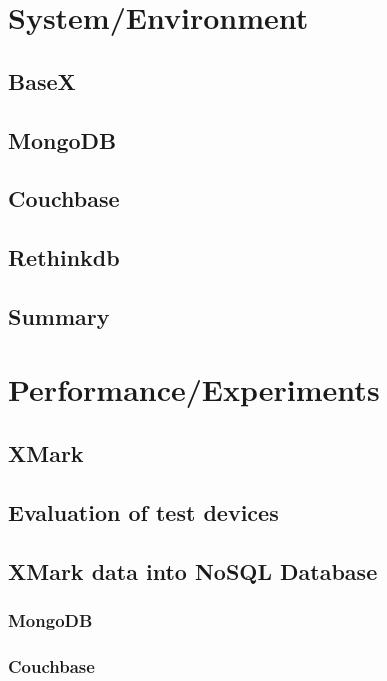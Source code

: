 \documentclass[a4paper,12pt]{article}
\begin{document}
	\section{System/Environment}
		\subsection{BaseX}
			
			
			\newpage
		\subsection{MongoDB}
		\subsection{Couchbase}
		\subsection{Rethinkdb}		
		\subsection{Summary}
	\newpage
	\section{Performance/Experiments}
		\subsection{XMark}
		\label{xmark}
			
		\subsection{Evaluation of test devices}
		\subsection{XMark data into NoSQL Database}
						
			\subsubsection{MongoDB}
			\label{xmark-mongodb}
			
			\subsubsection{Couchbase}
			\label{xmark-couchbase}
\end{document}
